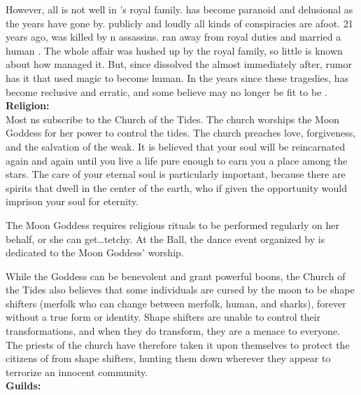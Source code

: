 \documentclass[blue]{NeptuneBall}
\begin{document}
However, all is not well in \pAtlantis{}'s royal family. \cPlant{\Prince} \cPlant{} has become paranoid and delusional as the years have gone by. \cPlant{\They} publicly and loudly  all kinds of conspiracies are afoot. 21 years ago, \cQueen{\King} \cQueen{} was killed by \pPacifica{}n assassins. \cAriel{\Prince} \cAriel{} ran away from \cAriel{\their} royal duties and married a human \cEric{\prince}. The whole affair was hushed up by the royal family, so little is known about how \cAriel{\they{}} managed it. But, since \cKing{} dissolved the \pMagician{} almost immediately after, rumor has it that \cAriel{\they} used magic to become human. In the years since these tragedies, \cKing{} has become reclusive and erratic, and some believe \cKing{\they{}} may no longer be fit to be \cKing{\King}.\\

{\bf Religion:}\\
Most \pAtlantis{}ns subscribe to the Church of the Tides. The church worships the Moon Goddess for her power to control the tides. The church preaches love, forgiveness, and the salvation of the weak. It is believed that your soul will be reincarnated again and again until you live a life pure enough to earn you a place among the stars. The care of your eternal soul is particularly important, because there are spirits that dwell in the center of the earth, who if given the opportunity would imprison your soul for eternity.

The Moon Goddess requires religious rituals to be performed regularly on her behalf, or she can get\ldots tetchy.  At the Ball, the dance event organized by \cPrincess{\Prince} \cPrincess{} is dedicated to the Moon Goddess' worship.

While the Goddess can be benevolent and grant powerful boons, the Church of the Tides also believes that some individuals are cursed by the moon to be shape shifters (merfolk who can change between merfolk, human, and sharks), forever without a true form or identity. Shape shifters are unable to control their transformations, and when they do transform, they are a menace to everyone. The priests of the church have therefore taken it upon themselves to protect the citizens of \pAtlantis{} from shape shifters, hunting them down wherever they appear to terrorize an innocent community.\\

{\bf Guilds:}\\
\end{document}
